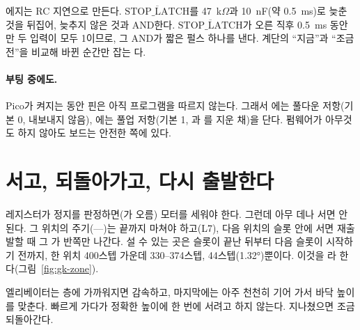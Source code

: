 에지는 RC 지연으로 만든다. $\overline{\text{STOP\_LATCH}}$를 47~k$\Omega$과 10~nF(약 0.5~ms)로 늦춘 것을 뒤집어, 늦추지
않은 것과 AND한다. $\overline{\text{STOP\_LATCH}}$가 오른 직후 0.5~ms 동안만 두 입력이 모두 1이므로, 그 AND가 짧은 펄스
하나를 낸다. 계단의 ``지금''과 ``조금 전''을 비교해 바뀐 순간만 잡는 다.

\paragraph{부팅 중에도.} Pico가 켜지는 동안 핀은 아직 프로그램을 따르지 않는다. 그래서 에는 풀다운 저항(기본 0,
내보내지 않음), 에는 풀업 저항(기본 1, 과 를 지운 채)을 단다. 펌웨어가 아무것도 하지
않아도 보드는 안전한 쪽에 있다.

\section{서고, 되돌아가고, 다시 출발한다}\label{sec:gk-stop}

\Why 레지스터가 정지를 판정하면(가 오름) 모터를 세워야 한다. 그런데 아무 데나 서면 안 된다. 그 위치의
주기(----)는 끝까지 마쳐야 하고(L7), 다음 위치의  슬롯 안에 서면 재출발할 때
그 가 반쪽만 나간다. 설 수 있는 곳은  슬롯이 끝난 뒤부터 다음  슬롯이 시작하기 전까지,
한 위치 400스텝 가운데 330--374스텝, 44스텝(1.32°)뿐이다. 이것을 라 한다(그림~\ref{fig:gk-zone}).

\General 엘리베이터는 층에 가까워지면 감속하고, 마지막에는 아주 천천히 기어 가서 바닥 높이를 맞춘다. 빠르게 가다가 정확한
높이에 한 번에 서려고 하지 않는다. 지나쳤으면 조금 되돌아간다.

